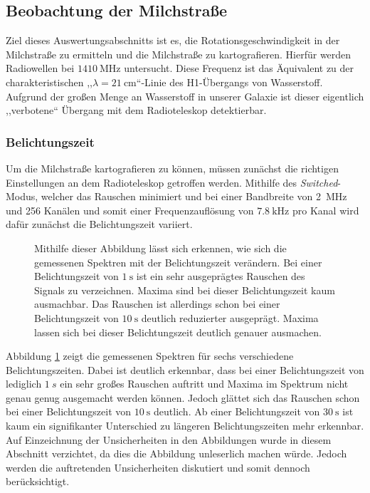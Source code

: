 \subsection{Beobachtung der Milchstraße}
Ziel dieses Auswertungsabschnitts ist es, die Rotationsgeschwindigkeit in der Milchstraße zu ermitteln und die Milchstraße zu kartografieren.\newline
Hierfür werden Radiowellen bei $\SI{1410}{\mega \hertz}$ untersucht. Diese Frequenz ist das Äquivalent zu der charakteristischen ,,$\lambda = \SI{21}{\centi \metre}$``-Linie des H1-Übergangs von Wasserstoff. Aufgrund der großen Menge an Wasserstoff in unserer Galaxie ist dieser eigentlich ,,verbotene`` Übergang mit dem Radioteleskop detektierbar.\newline
\subsubsection{Belichtungszeit}
Um die Milchstraße kartografieren zu können, müssen zunächst die richtigen Einstellungen an dem Radioteleskop getroffen werden. Mithilfe des \textit{Switched}-Modus, welcher das Rauschen minimiert und bei einer Bandbreite von \SI{2}{MHz} und 256 Kanälen und somit einer Frequenzauflösung von $\SI{7.8}{\kilo \hertz}$ pro Kanal \cite{Usermanual} wird dafür zunächst die Belichtungszeit variiert. 
\begin{figure}[H]
    \centering
    \resizebox{0.8\textwidth}{!}{} 
    \caption[Gemessene Spektren bei verschiedenen Belichtungszeiten]{Mithilfe dieser Abbildung lässt sich erkennen, wie sich die gemessenen Spektren mit der Belichtungszeit verändern. Bei einer Belichtungszeit von $\SI{1}{\second}$ ist ein sehr ausgeprägtes Rauschen des Signals zu verzeichnen. Maxima sind bei dieser Belichtungszeit kaum ausmachbar. Das Rauschen ist allerdings schon bei einer Belichtungszeit von $\SI{10}{\second}$ deutlich reduzierter ausgeprägt. Maxima lassen sich bei dieser Belichtungszeit deutlich genauer ausmachen.}
    \label{fig:Belichtungszeit}
\end{figure}
Abbildung \ref{fig:Belichtungszeit} zeigt die gemessenen Spektren für sechs verschiedene Belichtungszeiten.
Dabei ist deutlich erkennbar, dass bei einer Belichtungszeit von lediglich $\SI{1}{s}$ ein sehr großes Rauschen auftritt und Maxima im Spektrum nicht genau genug ausgemacht werden können. Jedoch glättet sich das Rauschen schon bei einer Belichtungszeit von $\SI{10}{\second}$ deutlich. Ab einer Belichtungszeit von $\SI{30}{\second}$ ist kaum ein signifikanter Unterschied zu längeren Belichtungszeiten mehr erkennbar. Auf Einzeichnung der Unsicherheiten in den Abbildungen wurde in diesem Abschnitt verzichtet, da dies die Abbildung unleserlich machen würde. Jedoch werden die auftretenden Unsicherheiten diskutiert und somit dennoch berücksichtigt.

